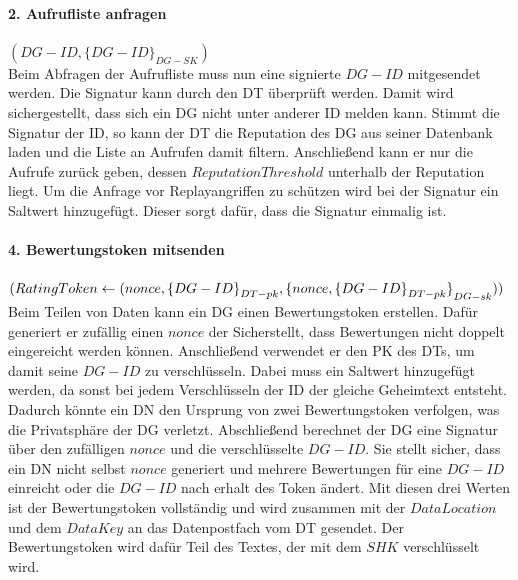 \documentclass[
	fontsize=11pt,
	headings=small,
	parskip=half,           %
	bibliography=totoc,
	numbers=noenddot,       %
	open=any,               %
]{scrreprt}
\begin{document}
\paragraph{2. Aufrufliste anfragen} $(DG-ID, {\{DG-ID\}}_{DG-SK})$\\
Beim Abfragen der Aufrufliste muss nun eine signierte $DG-ID$ mitgesendet werden. Die Signatur kann durch den DT überprüft werden. Damit wird sichergestellt, dass sich ein DG nicht unter anderer ID melden kann. Stimmt die Signatur der ID, so kann der DT die Reputation des DG aus seiner Datenbank laden und die Liste an Aufrufen damit filtern. Anschließend kann er nur die Aufrufe zurück geben, dessen $ReputationThreshold$ unterhalb der Reputation liegt. Um die Anfrage vor Replayangriffen zu schützen wird bei der Signatur ein Saltwert hinzugefügt. Dieser sorgt dafür, dass die Signatur einmalig ist.

\paragraph{4. Bewertungstoken mitsenden}$(RatingToken \leftarrow (nonce, {\{DG-ID\}}_{DT-pk},\\{\{nonce, {\{DG-ID\}}_{DT-pk}\}}_{DG-sk}))$\\
Beim Teilen von Daten kann ein DG einen Bewertungstoken erstellen. Dafür generiert er zufällig einen $nonce$ der Sicherstellt, dass Bewertungen nicht doppelt eingereicht werden können. Anschließend verwendet er den PK des DTs, um damit seine $DG-ID$ zu verschlüsseln. Dabei muss ein Saltwert hinzugefügt werden, da sonst bei jedem Verschlüsseln der ID der gleiche Geheimtext entsteht. Dadurch könnte ein DN den Ursprung von zwei Bewertungstoken verfolgen, was die Privatsphäre der DG verletzt. Abschließend berechnet der DG eine Signatur über den zufälligen $nonce$ und die verschlüsselte $DG-ID$. Sie stellt sicher, dass ein DN nicht selbst $nonce$ generiert und mehrere Bewertungen für eine $DG-ID$ einreicht oder die $DG-ID$ nach erhalt des Token ändert. Mit diesen drei Werten ist der Bewertungstoken vollständig und wird zusammen mit der $DataLocation$ und dem $DataKey$ an das Datenpostfach vom DT gesendet. Der Bewertungstoken wird dafür Teil des Textes, der mit dem $SHK$ verschlüsselt wird.
\end{document}
